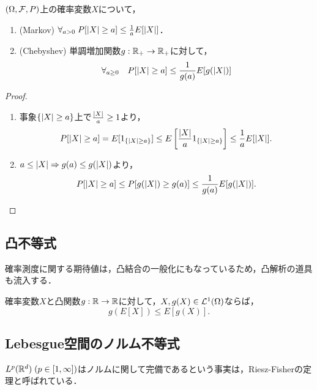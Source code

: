 \documentclass[uplatex,dvipdfmx]{jsreport}
\begin{document}
\begin{proposition}\label{prop-Markov}
    $(\Omega,\mathcal{F},P)$上の確率変数$X$について，
    \begin{enumerate}
        \item (Markov) $\forall_{a>0}\;P[\lvert X\rvert\ge a]\le\frac{1}{a}E[\lvert X\rvert]$．
        \item (Chebyshev) 単調増加関数$g:\mathbb{R}_+\to\mathbb{R}_+$に対して，
        \[\forall_{a\ge 0}\quad P[\lvert X\rvert\ge a]\le\frac{1}{g(a)}E[g(\lvert X\rvert)]\]
    \end{enumerate}
\end{proposition}
\begin{proof}\mbox{}
    \begin{enumerate}
        \item 事象$\{\lvert X\rvert\ge a\}$上で$\frac{\lvert X\rvert}{a}\ge 1$より，
        \[P[\lvert X\rvert\ge a]=E[1_{\left\{\lvert X\rvert\ge a\right\}}]\le E\left[\frac{\lvert X\rvert}{a}1_{\left\{\lvert X\rvert\ge a\right\}}\right]\le \frac{1}{a}E[\lvert X\rvert].\]
        \item $a\le\lvert X\rvert\Rightarrow g(a)\le g(\lvert X\rvert)$より，
        \[P[\lvert X\rvert\ge a]\le P[g(\lvert X\rvert)\ge g(a)]\le\frac{1}{g(a)}E[g(\lvert X\rvert)].\]
    \end{enumerate}
\end{proof}

\subsection{凸不等式}

\begin{tcolorbox}[colframe=ForestGreen, colback=ForestGreen!10!white,breakable,colbacktitle=ForestGreen!40!white,coltitle=black,fonttitle=\bfseries\sffamily,
title=]
    確率測度に関する期待値は，凸結合の一般化にもなっているため，凸解析の道具も流入する．
\end{tcolorbox}

\begin{proposition}[Jensenの不等式]
    確率変数$X$と凸関数$g:\mathbb{R}\to\mathbb{R}$に対して，$X,g(X)\in\mathcal{L}^1(\Omega)$ならば，
    \[g(E[X])\le E[g(X)].\]
\end{proposition}

\subsection{Lebesgue空間のノルム不等式}

\begin{tcolorbox}[colframe=ForestGreen, colback=ForestGreen!10!white,breakable,colbacktitle=ForestGreen!40!white,coltitle=black,fonttitle=\bfseries\sffamily,
title=]
    $L^p(\mathbb{R}^d)\;(p\in[1,\infty])$はノルムに関して完備であるという事実は，Riesz-Fisherの定理と呼ばれている．
\end{tcolorbox}
\end{document}
